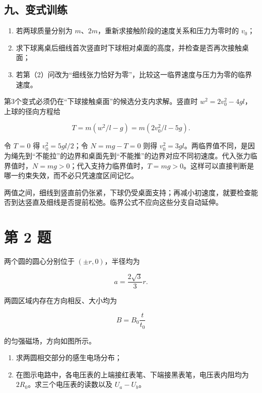 \documentclass[12pt,a4paper,UTF8]{ctexart}
\newcommand{\tightlist}{\setlength{\itemsep}{0pt}\setlength{\parskip}{0pt}}
\begin{document}
\subsection{九、变式训练}\label{ux4e5dux53d8ux5f0fux8badux7ec3}

\begin{enumerate}
\def\labelenumi{\arabic{enumi}.}
\tightlist
\item
  若两球质量分别为 \(m\)、\(2m\)，重新求接触阶段的速度关系和压力为零时的
  \(v_0\)；
\item
  求下球离桌后细线首次竖直时下球相对桌面的高度，并检查是否再次接触桌面；
\item
  若第（2）问改为``细线张力恰好为零''，比较这一临界速度与压力为零的临界速度。
\end{enumerate}

第3个变式必须仍在``下球接触桌面''的候选分支内求解。竖直时
\(w^2=2v_0^2-4gl\)，上球的径向方程给

\[T=m(w^2/l-g)=m(2v_0^2/l-5g).\]

令 \(T=0\) 得 \(v_0^2=5gl/2\)；令 \(N=mg-T=0\) 则得
\(v_0^2=3gl\)。两临界值不同，是因为绳先到``不能拉''的边界和桌面先到``不能推''的边界对应不同初速度。代入张力临界值时，\(N=mg>0\)；代入支持力临界值时，\(T=mg>0\)。这样可以直接判断是哪一约束失效，而不必只凭速度区间记忆。

两值之间，细线到竖直前仍张紧，下球仍受桌面支持；再减小初速度，就要检查能否到达竖直及细线是否提前松弛。临界公式不应向这些分支自动延伸。

\newpage

\section{第 2 题}\label{ux7b2c-2-ux9898}

两个圆的圆心分别位于 \((\pm r,0)\)，半径均为

\[
a=\frac{2\sqrt3}{3}r.
\]

两圆区域内存在方向相反、大小均为

\[
B=B_0\frac{t}{t_0}
\]

的匀强磁场，方向如图所示。

\begin{enumerate}
\def\labelenumi{\arabic{enumi}.}
\tightlist
\item
  求两圆相交部分的感生电场分布；
\item
  在图示电路中，各电压表的上端接红表笔、下端接黑表笔，电压表内阻均为
  \(2R_0\)。求三个电压表的读数以及 \(U_a-U_b\)。
\end{enumerate}
\end{document}
